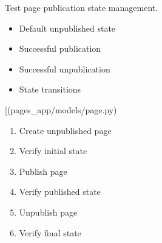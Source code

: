 \documentclass[letterpaper,10pt,english]{sphinxmanual}
\begin{document}
\begin{fulllineitems}

\begin{fulllineitems}
\label{\detokenize{pages_app.tests:pages_app.tests.test_models.PageModelTest.test_publish_unpublish}}
\pysigstartsignatures
\pysiglinewithargsret
{}
{}
{}
\pysigstopsignatures
\sphinxAtStartPar
Test page publication state management.
\begin{description}
\begin{itemize}
\item {} 
\sphinxAtStartPar
Default unpublished state

\item {} 
\sphinxAtStartPar
Successful publication

\item {} 
\sphinxAtStartPar
Successful unpublication

\item {} 
\sphinxAtStartPar
State transitions

\end{itemize}

\sphinxAtStartPar
{[}\sphinxtitleref{Page}{]}(pages\_app/models/page.py)

\begin{enumerate}
%
\item {} 
\sphinxAtStartPar
Create unpublished page

\item {} 
\sphinxAtStartPar
Verify initial state

\item {} 
\sphinxAtStartPar
Publish page

\item {} 
\sphinxAtStartPar
Verify published state

\item {} 
\sphinxAtStartPar
Unpublish page

\item {} 
\sphinxAtStartPar
Verify final state

\end{enumerate}

\end{description}


\end{fulllineitems}
\end{fulllineitems}
\end{document}
